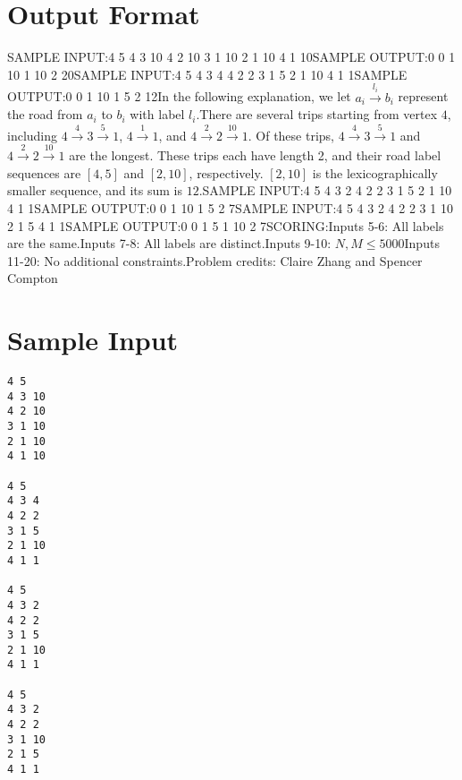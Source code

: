 \documentclass[12pt]{article}
\begin{document}
\section*{Output Format}
SAMPLE INPUT:4 5
4 3 10
4 2 10
3 1 10
2 1 10
4 1 10SAMPLE OUTPUT:0 0
1 10
1 10
2 20SAMPLE INPUT:4 5
4 3 4
4 2 2
3 1 5
2 1 10
4 1 1SAMPLE OUTPUT:0 0
1 10
1 5
2 12In the following explanation, we let $a_i\overset{l_i}\to b_i$ represent the
road from $a_i$ to $b_i$ with label $l_i$.There are several trips starting from vertex $4$, including
$4 \overset{4}\to 3\overset{5}\to 1$, $4\overset{1}\to 1$, and
$4\overset{2}\to 2\overset{10}\to 1$. Of these trips,
$4 \overset{4}\to 3\overset{5}\to 1$ and $4\overset{2}\to 2\overset{10}\to 1$
are the longest. These trips each have length 2, and their road label sequences
are $[4,5]$ and $[2,10]$, respectively. $[2,10]$ is the lexicographically
smaller sequence, and its sum is $12$.SAMPLE INPUT:4 5
4 3 2
4 2 2
3 1 5
2 1 10
4 1 1SAMPLE OUTPUT:0 0
1 10
1 5
2 7SAMPLE INPUT:4 5
4 3 2
4 2 2
3 1 10
2 1 5
4 1 1SAMPLE OUTPUT:0 0
1 5
1 10
2 7SCORING:Inputs 5-6: All labels are the same.Inputs 7-8: All labels are distinct.Inputs 9-10: $N,M\le 5000$Inputs 11-20: No additional constraints.Problem credits: Claire Zhang and Spencer Compton

\section*{Sample Input}
\begin{verbatim}
4 5
4 3 10
4 2 10
3 1 10
2 1 10
4 1 10

4 5
4 3 4
4 2 2
3 1 5
2 1 10
4 1 1

4 5
4 3 2
4 2 2
3 1 5
2 1 10
4 1 1

4 5
4 3 2
4 2 2
3 1 10
2 1 5
4 1 1
\end{verbatim}
\end{document}
